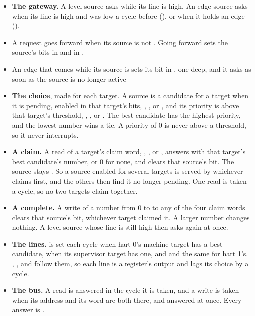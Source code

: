 \begin{itemize}
\item \textbf{The gateway.} A level source asks while its line is high.
An edge source asks when its line is high and was low a cycle before
(), or when it holds an edge ().
\item A request goes forward when its source is not .
Going forward sets the source's bits in  and in
.
\item An edge that comes while its source is  sets its bit
in , one deep, and it asks as soon as the source is no
longer active.
\item \textbf{The choice}, made for each target. A source is a
candidate for a target when it is pending, enabled in that target's
bits, , ,  or
, and its priority is above that target's threshold,
, ,  or
. The best
candidate has the highest priority, and the lowest number wins a tie.
A priority of 0 is never above a threshold, so it never interrupts.
\item \textbf{A claim.} A read of a target's claim word,
, ,  or
, answers with that target's best
candidate's number, or 0 for none, and clears that source's
 bit. The source stays . So a source
enabled for several targets is served by whichever claims first, and
the others then find it no longer pending. One read is taken a cycle,
so no two targets claim together.
\item \textbf{A complete.} A write of a number from 0 to  to
any of the four claim words clears that source's  bit,
whichever target claimed it. A larger number changes nothing. A level
source whose line is still high then asks again at once.
\item \textbf{The lines.}  is set each cycle when hart
0's machine target has a best candidate,  when its
supervisor target has one, and  and
 the same for hart 1's. , ,
 and  follow them, so each line is a register's
output and lags its choice by a cycle.
\item \textbf{The bus.} A read is answered in the cycle it is taken, and
a write is taken when its address and its word are both there, and
answered  at once. Every answer is .
\end{itemize}

